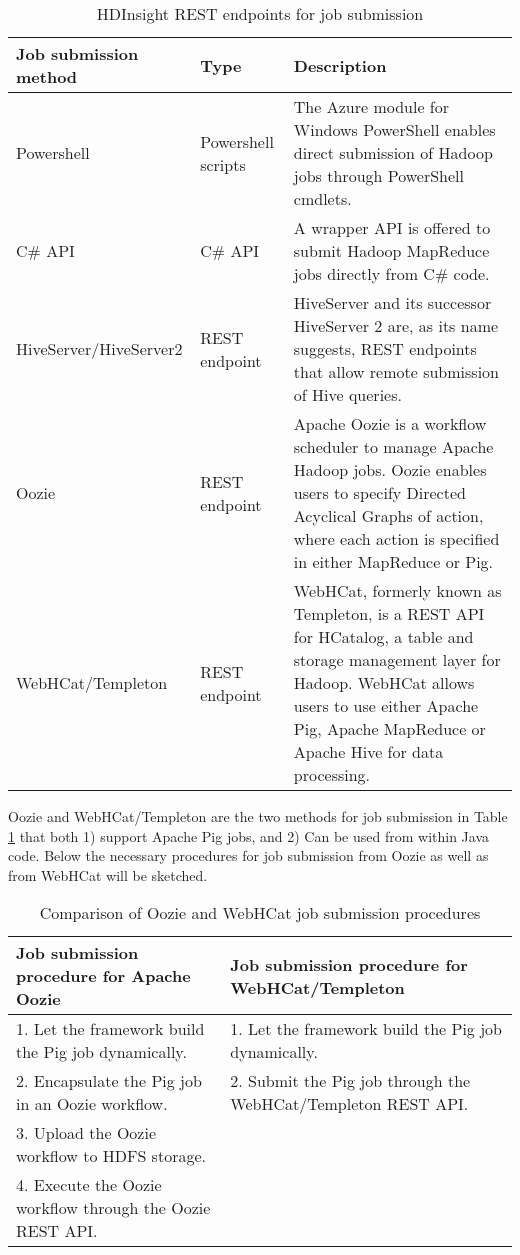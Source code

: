\begin{table}
\centering
\begin{tabular}{p{4cm}p{2.8cm}p{5.5cm}}\toprule
Job submission method & Type & Description \\
\midrule
Powershell & Powershell scripts & The Azure module for Windows PowerShell enables direct submission of Hadoop jobs through PowerShell cmdlets.\\
C\# API & C\# API & A wrapper API is offered to submit Hadoop MapReduce jobs directly from C\# code.\\
HiveServer/HiveServer2 & REST endpoint & HiveServer and its successor HiveServer 2 are, as its name suggests, REST endpoints that allow remote submission of Hive queries.\\
Oozie & REST endpoint & Apache Oozie is a workflow scheduler to manage Apache Hadoop jobs. Oozie enables users to specify Directed Acyclical Graphs of action, where each action is specified in either MapReduce or Pig.\\
WebHCat/Templeton & REST endpoint & WebHCat, formerly known as Templeton, is a REST API for HCatalog, a table and storage management layer for Hadoop. WebHCat allows users to use either Apache Pig, Apache MapReduce or Apache Hive for data processing.\\	
\bottomrule
\end{tabular}
\caption{HDInsight REST endpoints for job submission}
\label{tbl:hdinsight_endpoints}
\end{table}

Oozie and WebHCat/Templeton are the two methods for job submission in Table \ref{tbl:hdinsight_endpoints} that both 1) support Apache Pig jobs, and 2) Can be used from within Java code. Below the necessary procedures for job submission from Oozie as well as from WebHCat will be sketched.\\

\begin{table}
\centering
\begin{tabular}{p{5cm}p{5cm}}\toprule
Job submission procedure for Apache Oozie & Job submission procedure for WebHCat/Templeton \\
\midrule
1. Let the framework build the Pig job dynamically. & 1. Let the framework build the Pig job dynamically.\\
2. Encapsulate the Pig job in an Oozie workflow. & 2. Submit the Pig job through the WebHCat/Templeton REST API.\\
3. Upload the Oozie workflow to HDFS storage. & \\
4. Execute the Oozie workflow through the Oozie REST API. & \\
\bottomrule
\end{tabular}
\caption{Comparison of Oozie and WebHCat job submission procedures}
\label{tbl:oozie_templeton}
\end{table}

